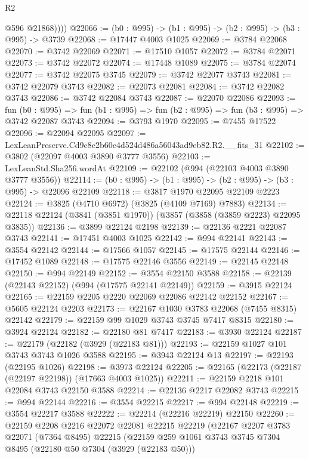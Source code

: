 \begin{lexlean}{R2}
\begin{coremodule}
            @596
            @21868))))
@22066 := (b0 : @995) -> (b1 : @995) -> (b2 : @995) -> (b3 : @995) -> @3739
@22068 := @17447 @4003 @1025
@22069 := @3784 @22068
@22070 := @3742 @22069
@22071 := @17510 @1057
@22072 := @3784 @22071
@22073 := @3742 @22072
@22074 := @17448 @1089
@22075 := @3784 @22074
@22077 := @3742 @22075 @3745
@22079 := @3742 @22077 @3743
@22081 := @3742 @22079 @3743
@22082 := @22073 @22081
@22084 := @3742 @22082 @3743
@22086 := @3742 @22084 @3743
@22087 := @22070 @22086
@22093 := fun (b0 : @995) =>
  fun (b1 : @995) => fun (b2 : @995) => fun (b3 : @995) => @3742 @22087 @3743
@22094 := @3793 @1970
@22095 := @7455 @17522
@22096 := @22094 @22095
@22097 := LexLeanPreserve.Cd9c8c2b60c4d524d486a56043ad9eb82.R2.__fits_31
@22102 := @3802 (@22097 @4003 @3890 @3777 @3556)
@22103 := LexLeanStd.Sha256.wordAt
@22109 := @22102 (@994 (@22103 @4003 @3890 @3777 @3556))
@22114 := (b0 : @995) -> (b1 : @995) -> (b2 : @995) -> (b3 : @995) -> @22096 @22109
@22118 := @3817 @1970 @22095 @22109 @2223
@22124 := @3825 (@4710 @6972) (@3825 (@4109 @7169) @7883)
@22134 := @22118 @22124 (@3841 (@3851 @1970)) (@3857 (@3858 (@3859 @2223) @22095 @3835))
@22136 := @3899 @22124 @2198
@22139 := @22136 @2221 @22087 @3743
@22141 := @17451 @4003 @1025
@22142 := @994 @22141
@22143 := @3554 @22142
@22144 := @17566 @1057
@22145 := @17575 @22144
@22146 := @17452 @1089
@22148 := @17575 @22146 @3556
@22149 := @22145 @22148
@22150 := @994 @22149
@22152 := @3554 @22150 @3588
@22158 := @22139 (@22143 @22152) (@994 (@17575 @22141 @22149))
@22159 := @3915 @22124
@22165 := @22159 @2205 @2220 @22069 @22086 @22142 @22152
@22167 := @5605 @22124 @2203
@22173 := @22167 @1030 @3783 @22068 (@7455 @8315) @22142
@22179 := @22159 @99 @1029 @3743 @3745 @7417 @8315
@22180 := @3924 @22124
@22182 := @22180 @81 @7417
@22183 := @3930 @22124
@22187 := @22179 (@22182 (@3929 (@22183 @81)))
@22193 := @22159 @1027 @101 @3743 @3743 @1026 @3588
@22195 := @3943 @22124 @13
@22197 := @22193 (@22195 @1026)
@22198 := @3973 @22124
@22205 := @22165 (@22173 (@22187 (@22197 @22198)) (@17663 @4003 @1025))
@22211 := @22159 @2218 @101 @22084 @3743 @22150 @3588
@22214 := @22136 @2217 @22082 @3743
@22215 := @994 @22144
@22216 := @3554 @22215
@22217 := @994 @22148
@22219 := @3554 @22217 @3588
@22222 := @22214 (@22216 @22219) @22150
@22260 := @22159
    @2208
    @2216
    @22072
    @22081
    @22215
    @22219
    (@22167
      @2207
      @3783
      @22071
      (@7364 @8495)
      @22215
      (@22159
        @259
        @1061
        @3743
        @3745
        @7304
        @8495
        (@22180 @50 @7304 (@3929 (@22183 @50)))

\end{coremodule}
\end{lexlean}
